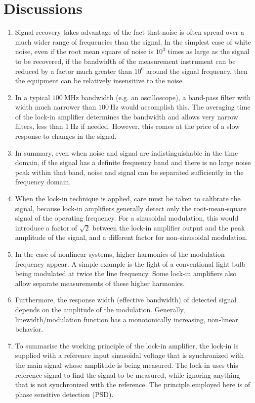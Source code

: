 \documentclass[%
 reprint,
nofootinbib,
 amsmath,amssymb,
 aps,
]{revtex4-2}
\begin{document}
\section{Discussions}
\begin{enumerate}
    \item Signal recovery takes advantage of the fact that noise is often spread over a much wider range of frequencies than the signal. In the simplest case of white noise, even if the root mean square of noise is $10^3$ times as large as the signal to be recovered, if the bandwidth of the measurement instrument can be reduced by a factor much greater than $10^6$ around the signal frequency, then the equipment can be relatively insensitive to the noise.
    \item In a typical $\SI{100}{\mega \hertz}$ bandwidth (e.g. an oscilloscope), a band-pass filter with width much narrower than $\SI{100}{\hertz}$ would accomplish this. The averaging time of the lock-in amplifier determines the bandwidth and allows very narrow filters, less than $\SI{1}{\hertz}$ if needed. However, this comes at the price of a slow response to changes in the signal.
    \item In summary, even when noise and signal are indistinguishable in the time domain, if the signal has a definite frequency band and there is no large noise peak within that band, noise and signal can be separated sufficiently in the frequency domain.
    \item When the lock-in technique is applied, care must be taken to calibrate the signal, because lock-in amplifiers generally detect only the root-mean-square signal of the operating frequency. For a sinusoidal modulation, this would introduce a factor of $\sqrt{2}$ between the lock-in amplifier output and the peak amplitude of the signal, and a different factor for non-sinusoidal modulation.
    \item In the case of nonlinear systems, higher harmonics of the modulation frequency appear. A simple example is the light of a conventional light bulb being modulated at twice the line frequency. Some lock-in amplifiers also allow separate measurements of these higher harmonics.
    \item Furthermore, the response width (effective bandwidth) of detected signal depends on the amplitude of the modulation. Generally, linewidth/modulation function has a monotonically increasing, non-linear behavior.
    \item To summarise the working principle of the lock-in amplifier, the lock-in is supplied with a reference input sinusoidal voltage that is synchronized with the main signal whose amplitude is being measured. The lock-in uses this reference signal to find the signal to be measured, while ignoring anything that is not synchronized with the reference. The principle employed here is of phase sensitive detection (PSD).

\end{enumerate}
\end{document}
